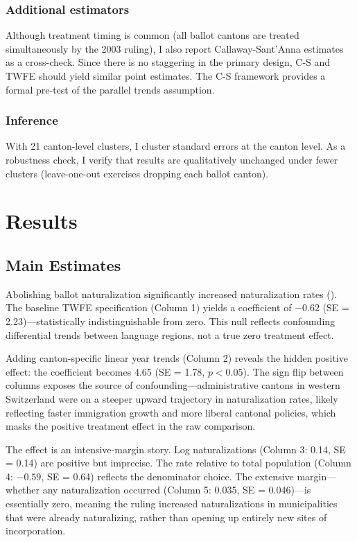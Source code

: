 \documentclass[12pt]{article}
\begin{document}
\subsubsection*{Additional estimators} Although treatment timing is common (all ballot cantons are treated simultaneously by the 2003 ruling), I also report Callaway-Sant'Anna estimates \citep{callaway2021} as a cross-check. Since there is no staggering in the primary design, C-S and TWFE should yield similar point estimates. The C-S framework provides a formal pre-test of the parallel trends assumption.

\subsubsection*{Inference} With 21 canton-level clusters, I cluster standard errors at the canton level. As a robustness check, I verify that results are qualitatively unchanged under fewer clusters (leave-one-out exercises dropping each ballot canton).


\section{Results}\label{sec:results}

\subsection{Main Estimates}

Abolishing ballot naturalization significantly increased naturalization rates (). The baseline TWFE specification (Column 1) yields a coefficient of $-0.62$ (SE = 2.23)---statistically indistinguishable from zero. This null reflects confounding differential trends between language regions, not a true zero treatment effect.

Adding canton-specific linear year trends (Column 2) reveals the hidden positive effect: the coefficient becomes 4.65 (SE = 1.78, $p < 0.05$). The sign flip between columns exposes the source of confounding---administrative cantons in western Switzerland were on a steeper upward trajectory in naturalization rates, likely reflecting faster immigration growth and more liberal cantonal policies, which masks the positive treatment effect in the raw comparison.

The effect is an intensive-margin story. Log naturalizations (Column 3: 0.14, SE = 0.14) are positive but imprecise. The rate relative to total population (Column 4: $-0.59$, SE = 0.64) reflects the denominator choice. The extensive margin---whether any naturalization occurred (Column 5: 0.035, SE = 0.046)---is essentially zero, meaning the ruling increased naturalizations in municipalities that were already naturalizing, rather than opening up entirely new sites of incorporation.
\end{document}
